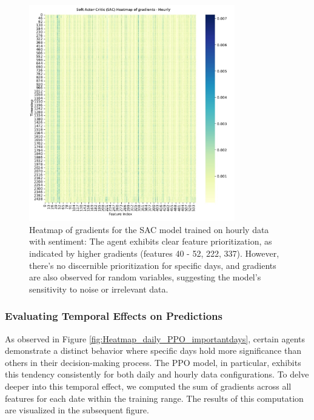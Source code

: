 \documentclass[12pt]{article}
\begin{document}
\begin{figure}[h]
    \centering
    \includegraphics[width=0.8\textwidth]{figs/Heatmap_hourly_SAC_featureImportance.jpg}
    \caption{Heatmap of gradients for the SAC model trained on hourly data with sentiment: The agent exhibits clear feature prioritization, as indicated by higher gradients (features 40 - 52, 222, 337). However, there's no discernible prioritization for specific days, and gradients are also observed for random variables, suggesting the model's sensitivity to noise or irrelevant data.}
    \label{Heatmap_hourly_SAC_featureImportance}
\end{figure}


\subsubsection{Evaluating Temporal Effects on Predictions}

As observed in Figure \ref{fig:Heatmap_daily_PPO_importantdays}, certain agents demonstrate a distinct behavior where specific days hold more significance than others in their decision-making process. The PPO model, in particular, exhibits this tendency consistently for both daily and hourly data configurations. To delve deeper into this temporal effect, we computed the sum of gradients across all features for each date within the training range. The results of this computation are visualized in the subsequent figure.
\end{document}
